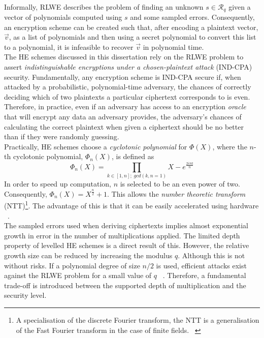 \smallskip \\ \indent
Informally, RLWE describes the problem of finding an unknown $s \in \mathcal{R}_q$ given a vector of polynomials computed using $s$ and some sampled errors. Consequently, an encryption scheme can be created such that, after encoding a plaintext vector, $\vec{v}$, as a list of polynomials and then using a secret polynomial to convert this list to a polynomial, it is infeasible to recover $\vec{v}$ in polynomial time.
\smallskip \\ \indent
The HE schemes discussed in this dissertation rely on the RLWE problem to assert \textit{indistinguishable encryptions under a chosen-plaintext attack} (IND-CPA) security. Fundamentally, any encryption scheme is IND-CPA secure if, when attacked by a probabilistic, polynomial-time adversary, the chances of correctly deciding which of two plaintexts a particular ciphertext corresponds to is even. Therefore, in practice, even if an adversary has access to an encryption \textit{oracle} that will encrypt any data an adversary provides, the adversary's chances of calculating the correct plaintext when given a ciphertext should be no better than if they were randomly guessing. 
\smallskip \\ \indent
Practically, HE schemes choose a \textit{cyclotonic polynomial} for $\Phi(X)$, where the $n$-th cyclotonic polynomial, $\Phi_n(X)$, is defined as
\begin{equation}
    \Phi_n(X) = \prod_{k \in [1, n]; \; gcd(k, n = 1)} X - e^\frac{2 i \pi k}{n}
\end{equation}
In order to speed up computation, $n$ is selected to be an even power of two. Consequently, $\Phi_n(X) = X^\frac{n}{2} + 1$. This allows the \textit{number theoretic transform} (NTT)\footnote{A specialisation of the discrete Fourier transform, the NTT is a generalisation of the Fast Fourier transform in the case of finite fields. ~\cite{NTT}}. The advantage of this is that it can be easily accelerated using hardware ~\cite{Hardware}.
\smallskip \\ \indent
The sampled errors used when deriving ciphertexts implies almost exponential growth in error in the number of multiplications applied. The limited depth property of levelled HE schemes is a direct result of this. However, the relative growth size can be reduced by increasing the modulus $q$. Although this is not without risks. If a polynomial degree of size $n/2$ is used, efficient attacks exist against the RLWE problem for a small value of $q$ ~\cite{HEStandard}. Therefore, a fundamental trade-off is introduced between the supported depth of multiplication and the security level.

